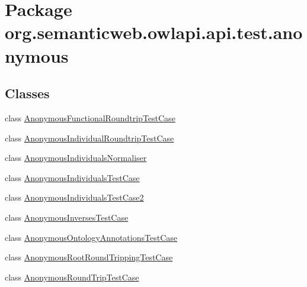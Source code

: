 \hypertarget{namespaceorg_1_1semanticweb_1_1owlapi_1_1api_1_1test_1_1anonymous}{\section{Package org.\-semanticweb.\-owlapi.\-api.\-test.\-anonymous}
\label{namespaceorg_1_1semanticweb_1_1owlapi_1_1api_1_1test_1_1anonymous}
}
\subsection*{Classes}
\begin{DoxyCompactItemize}
\item 
class \hyperlink{classorg_1_1semanticweb_1_1owlapi_1_1api_1_1test_1_1anonymous_1_1_anonymous_functional_roundtrip_test_case}{Anonymous\-Functional\-Roundtrip\-Test\-Case}
\item 
class \hyperlink{classorg_1_1semanticweb_1_1owlapi_1_1api_1_1test_1_1anonymous_1_1_anonymous_individual_roundtrip_test_case}{Anonymous\-Individual\-Roundtrip\-Test\-Case}
\item 
class \hyperlink{classorg_1_1semanticweb_1_1owlapi_1_1api_1_1test_1_1anonymous_1_1_anonymous_individuals_normaliser}{Anonymous\-Individuals\-Normaliser}
\item 
class \hyperlink{classorg_1_1semanticweb_1_1owlapi_1_1api_1_1test_1_1anonymous_1_1_anonymous_individuals_test_case}{Anonymous\-Individuals\-Test\-Case}
\item 
class \hyperlink{classorg_1_1semanticweb_1_1owlapi_1_1api_1_1test_1_1anonymous_1_1_anonymous_individuals_test_case2}{Anonymous\-Individuals\-Test\-Case2}
\item 
class \hyperlink{classorg_1_1semanticweb_1_1owlapi_1_1api_1_1test_1_1anonymous_1_1_anonymous_inverses_test_case}{Anonymous\-Inverses\-Test\-Case}
\item 
class \hyperlink{classorg_1_1semanticweb_1_1owlapi_1_1api_1_1test_1_1anonymous_1_1_anonymous_ontology_annotations_test_case}{Anonymous\-Ontology\-Annotations\-Test\-Case}
\item 
class \hyperlink{classorg_1_1semanticweb_1_1owlapi_1_1api_1_1test_1_1anonymous_1_1_anonymous_root_round_tripping_test_case}{Anonymous\-Root\-Round\-Tripping\-Test\-Case}
\item 
class \hyperlink{classorg_1_1semanticweb_1_1owlapi_1_1api_1_1test_1_1anonymous_1_1_anonymous_round_trip_test_case}{Anonymous\-Round\-Trip\-Test\-Case}

\end{DoxyCompactItemize}

